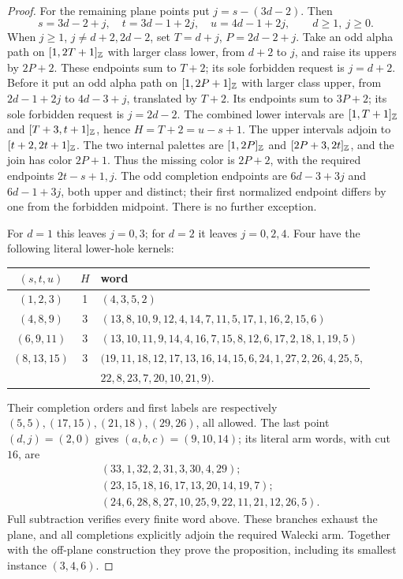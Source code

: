 \begin{proof}
For the remaining plane points put $j=s-(3d-2)$.  Then
\[
 s=3d-2+j,\quad t=3d-1+2j,\quad u=4d-1+2j,
 \qquad d\ge1,\ j\ge0.
\]
When $j\ge1$, $j\ne d+2,2d-2$, set
$T=d+j$, $P=2d-2+j$.
Take an odd alpha path on $[1,2T+1]_{\mathbb Z}$ with larger
class lower, from $d+2$ to $j$, and raise its uppers by $2P+2$.
These endpoints sum to $T+2$; its sole forbidden request is
$j=d+2$.  Before it put an odd alpha path on
$[1,2P+1]_{\mathbb Z}$ with larger class upper, from
$2d-1+2j$ to $4d-3+j$, translated by $T+2$.
Its endpoints sum to $3P+2$; its sole forbidden request is
$j=2d-2$.
The combined lower intervals are $[1,T+1]_{\mathbb Z}$ and
$[T+3,t+1]_{\mathbb Z}$, hence $H=T+2=u-s+1$.
The upper intervals adjoin to $[t+2,2t+1]_{\mathbb Z}$.
The two internal palettes are $[1,2P]_{\mathbb Z}$ and
$[2P+3,2t]_{\mathbb Z}$, and the join has color $2P+1$.
Thus the missing color is $2P+2$, with the required endpoints
$2t-s+1,j$.  The odd completion endpoints are
$6d-3+3j$ and $6d-1+3j$, both upper and distinct; their first
normalized endpoint differs by one from the forbidden midpoint.
There is no further exception.

For $d=1$ this leaves $j=0,3$; for $d=2$ it leaves $j=0,2,4$.
Four have the following literal lower-hole kernels:
\begin{center}\small
\begin{tabular}{ccl}
$(s,t,u)$&$H$&word\\\midrule
$(1,2,3)$&1&$(4,3,5,2)$\\
$(4,8,9)$&3&$(13,8,10,9,12,4,14,7,11,5,17,1,16,2,15,6)$\\
$(6,9,11)$&3&$(13,10,11,9,14,4,16,7,15,8,12,6,17,2,18,1,19,5)$\\
$(8,13,15)$&3&$(19,11,18,12,17,13,16,14,15,6,24,1,27,2,26,4,25,5,$\\
&&$22,8,23,7,20,10,21,9)$.
\end{tabular}\end{center}
Their completion orders and first labels are respectively
$(5,5),(17,15),(21,18),(29,26)$, all allowed.
The last point $(d,j)=(2,0)$ gives $(a,b,c)=(9,10,14)$;
its literal arm words, with cut $16$, are
\[
\begin{split}
 &(33,1,32,2,31,3,30,4,29);\\
 &(23,15,18,16,17,13,20,14,19,7);\\
 &(24,6,28,8,27,10,25,9,22,11,21,12,26,5).
\end{split}
\]
Full subtraction verifies every finite word above.  These branches
exhaust the plane, and all completions explicitly adjoin the required
Walecki arm.  Together with the off-plane construction they prove
the proposition, including its smallest instance $(3,4,6)$.
\end{proof}

